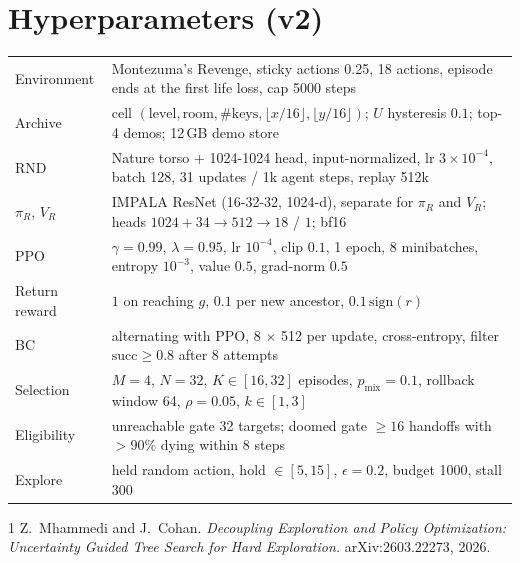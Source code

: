 \documentclass[10pt]{article}
\newcommand{\succr}{\mathrm{succ}}
\begin{document}
\section*{Hyperparameters (v2)}
\small
\begin{tabularx}{\linewidth}{@{}lX@{}}\toprule
Environment & Montezuma's Revenge, sticky actions 0.25, 18 actions, episode ends at the first life loss, cap 5000 steps\\
Archive & cell $(\text{level}, \text{room}, \#\text{keys}, \lfloor x/16\rfloor, \lfloor y/16\rfloor)$; $U$ hysteresis $0.1$; top-4 demos; 12\,GB demo store\\
RND & Nature torso + 1024-1024 head, input-normalized, lr $3\times10^{-4}$, batch 128, 31 updates / 1k agent steps, replay 512k\\
$\pi_R$, $V_R$ & IMPALA ResNet (16-32-32, 1024-d), separate for $\pi_R$ and $V_R$; heads $1024{+}34 \to 512 \to 18$ / $1$; bf16\\
PPO & $\gamma = 0.99$, $\lambda = 0.95$, lr $10^{-4}$, clip $0.1$, 1 epoch, 8 minibatches, entropy $10^{-3}$, value $0.5$, grad-norm $0.5$\\
Return reward & $1$ on reaching $g$, $0.1$ per new ancestor, $0.1\,\mathrm{sign}(r)$\\
BC & alternating with PPO, 8 $\times$ 512 per update, cross-entropy, filter $\succr \ge 0.8$ after 8 attempts\\
Selection & $M = 4$, $N = 32$, $K \in [16, 32]$ episodes, $p_{\text{mix}} = 0.1$, rollback window 64, $\rho = 0.05$, $k \in [1, 3]$\\
Eligibility & unreachable gate 32 targets; doomed gate $\ge 16$ handoffs with $> 90\%$ dying within 8 steps\\
Explore & held random action, hold $\in [5, 15]$, $\epsilon = 0.2$, budget 1000, stall 300\\
\bottomrule
\end{tabularx}

\begin{thebibliography}{1}\small
{} Z.~Mhammedi and J.~Cohan. \emph{Decoupling Exploration and Policy Optimization: Uncertainty Guided Tree Search for Hard Exploration.} arXiv:2603.22273, 2026.
\end{thebibliography}
\end{document}
